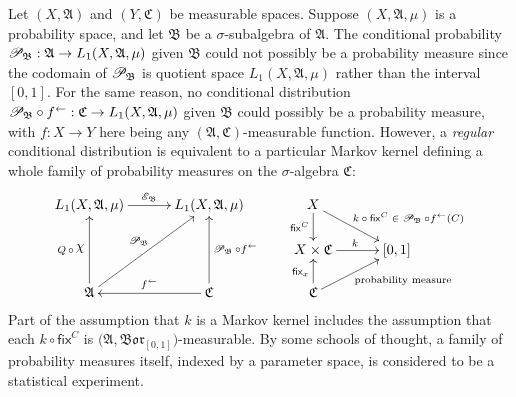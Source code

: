 \documentclass[
twoside=true,
paper=letter,
fontsize=11pt,
pagesize=auto,
leqno,
openany,
headsepline,
overfullrule,
]{scrbook}
\theoremstyle{plain}
\theoremstyle{plain}
\theoremstyle{definition}
\theoremstyle{bfnoteitalic}
\theoremstyle{bfnoteroman}
\newcommand{\sigalg}[1]{\mathfrak{#1}}
\newcommand{\cali}[1]{\mathscr{#1}}
\newcommand{\sfop}[1]{\mathsf{#1}}
\newcommand{\condexpop}[1]{\mathop{\cali{E}\hspace{-1pt}}\nolimits_{#1}}
\newcommand{\condprobop}[1]{\mathop{\cali{P}\hspace{-1pt}}\nolimits_{#1}}
\newcommand{\borel}{\mathfrak{Bor}}
\newcommand{\textsigma}{\hbox{\large{$\sigma$}}\kern-1pt}
\newcommand{\charfunction}[1]{{\raisebox{2pt}{$\chi$}}_{#1}}
\newcommand{\preimage}[1]{#1^{\leftarrow}}
\newcommand{\sigmaalgebra}{\sigalg{A}}
\newcommand{\sigmaalgebraii}{\sigalg{B}}
\newcommand{\sigmaalgebraiii}{\sigalg{C}}
\newcommand{\Lone}{L_1(\measurespace, \sigmaalgebra, \measure)}
\newcommand{\function}{f}
\newcommand{\measurespace}{X}
\newcommand{\measurespaceii}{Y}
\newcommand{\mspaceelt}{x}
\newcommand{\measure}{\mu}
\newcommand{\setiii}{C}
\newcommand{\markovkernel}{k}
\newcommand{\fixinthefirst}[1]{\sfop{fix}_{#1}}
\newcommand{\fixinthesecond}[1]{\sfop{fix}^{#1}}
\begin{document}
Let 
$(\measurespace, \sigmaalgebra)$ and 
$(\measurespaceii, \sigmaalgebraiii)$ be measurable spaces.
Suppose 
$(\measurespace,\sigmaalgebra,\measure)$
is a probability space, and let $\sigmaalgebraii$ be a \textsigma-subalgebra of 
$\sigmaalgebra$. 
The conditional probability 
$
\condprobop{\sigmaalgebraii}:
\sigmaalgebra \to 
L_1(\measurespace,\sigmaalgebra,\measure)
$
given $\sigmaalgebraii$ 
could not possibly be a probability measure since the  codomain
of $\condprobop{\sigmaalgebraii}$ is quotient space
$L_1(\measurespace,\sigmaalgebra,\measure)$ rather than the interval $[0,1]$.
For the same reason, no conditional distribution
${\condprobop{\sigmaalgebraii}}\circ \preimage{\function}
: \sigmaalgebraiii \to L_1(\measurespace,\sigmaalgebra,\measure)$
given $\sigmaalgebraii$
could possibly be a probability measure, 
with $\function:\measurespace\to\measurespaceii$ here being any 
$(\sigmaalgebra,\sigmaalgebraiii)$\hyp{}measurable function.
However, a \emph{regular} conditional distribution is equivalent to a particular Markov kernel defining a whole family of probability measures on the 
\textsigma-algebra $\sigmaalgebraiii$:
\[
\xymatrix@R=16pt@C=30pt{ 
\Lone \ar[r]^{\condexpop{\sigmaalgebraii}}
& \Lone 
& \measurespace 
\ar[d]_-{\fixinthesecond{\setiii}} 
\ar[dr]^{\qquad\text{$\markovkernel\circ\fixinthesecond{\setiii} \in \condprobop{\sigmaalgebraii}\circ \preimage{\function}(\setiii)$}}
\\
& 
& \measurespace\times\sigmaalgebraiii \ar[r]^{\markovkernel} 
& [0,1] 
\\
\sigmaalgebra 
\ar[uu]^{Q\,\circ\, \charfunction{}} 
\ar[uur]^{\condprobop{\sigmaalgebraii}} 
& \sigmaalgebraiii 
\ar[uu]_{\condprobop{\sigmaalgebraii}\circ \preimage{\function}} 
\ar[l]_{\preimage{\function}}
& \sigmaalgebraiii 
\ar[ur]_{\qquad\text{probability measure}} 
\ar[u]^{\fixinthefirst{\mspaceelt}} 
& 
\\
}
\]
Part of the assumption that $\markovkernel$ is a Markov kernel includes the assumption that each $\markovkernel\circ \fixinthesecond{\setiii}$ is
$\bigl(\sigmaalgebra,\borel_{[0,1]}\bigr)$\hyp{}measurable.
By some schools of thought, a family
of probability measures itself, indexed by a parameter space, is considered to be a statistical experiment.
\end{document}

